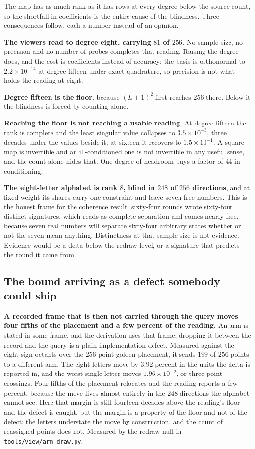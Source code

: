 The map has as much rank as it has rows at every degree below the source count, so the shortfall in coefficients is the entire cause of the blindness. Three consequences follow, each a number instead of an opinion.

\textbf{The viewers read to degree eight, carrying \(81\) of \(256\).} No sample size, no precision and no number of probes completes that reading. Raising the degree does, and the cost is coefficients instead of accuracy: the basis is orthonormal to \(2.2 \times 10^{-14}\) at degree fifteen under exact quadrature, so precision is not what holds the reading at eight.

\textbf{Degree fifteen is the floor}, because \((L+1)^2\) first reaches \(256\) there. Below it the blindness is forced by counting alone.

\textbf{Reaching the floor is not reaching a usable reading.} At degree fifteen the rank is complete and the least singular value collapses to \(3.5 \times 10^{-3}\), three decades under the values beside it; at sixteen it recovers to \(1.5 \times 10^{-1}\). A square map is invertible and an ill-conditioned one is not invertible in any useful sense, and the count alone hides that. One degree of headroom buys a factor of \(44\) in conditioning.

\textbf{The eight-letter alphabet is rank \(8\), blind in \(248\) of \(256\) directions}, and at fixed weight its shares carry one constraint and leave seven free numbers. This is the honest frame for the coherence result: sixty-four rounds wrote sixty-four distinct signatures, which reads as complete separation and comes nearly free, because seven real numbers will separate sixty-four arbitrary states whether or not the seven mean anything. Distinctness at that sample size is not evidence. Evidence would be a delta below the redraw level, or a signature that predicts the round it came from.

\subsection{The bound arriving as a defect somebody could ship}

\textbf{A recorded frame that is then not carried through the query moves four fifths of the placement and a few percent of the reading.} An arm is stated in some frame, and the derivation uses that frame; dropping it between the record and the query is a plain implementation defect. Measured against the eight sign octants over the \(256\)-point golden placement, it sends \(199\) of \(256\) points to a different arm. The eight letters move by \(3.92\) percent in the units the delta is reported in, and the worst single letter moves \(1.96 \times 10^{-2}\), or three point crossings. Four fifths of the placement relocates and the reading reports a few percent, because the move lives almost entirely in the \(248\) directions the alphabet cannot see. Here that margin is still fourteen decades above the reading's floor and the defect is caught, but the margin is a property of the floor and not of the defect: the letters understate the move by construction, and the count of reassigned points does not. Measured by the redraw null in \texttt{tools/\allowbreak{}view/\allowbreak{}arm\_draw.py}.

